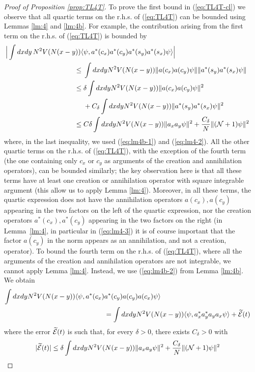 \documentclass[11pt,a4paper,DIV11]{scrartcl}	%
\newcommand{\wt}{\widetilde}
\newcommand{\cE}{{\cal E}}
\newcommand{\cN}{{\cal N}}
\begin{document}
\begin{proof}[Proof of Proposition \ref{prop:TL4T}] 
To prove the first bound in (\ref{eq:TL4T-cl}) we observe that all quartic terms on the r.h.s. of (\ref{eq:TL4T}) can be bounded using Lemmas \ref{lm:4} and \ref{lm:4b}. For example, the contribution arising from the 
first term on the r.h.s. of (\ref{eq:TL4T}) is bounded by
\[ \begin{split} 
\Big| \int dx dy \,  N^2 V (N (x-y)) \langle &\psi ,  a^* (c_x) a^* (c_y) a^* (s_y) a^* (s_x) \psi \rangle \Big| \\\leq \; & \int dx dy N^2 V(N (x-y)) \| a (c_x) a (c_y) \psi \| \| a^* (s_y) a^* (s_x) \psi \| \\
\leq \; & \delta \int dx dy N^2 V (N (x-y)) \| a (c_x) a(c_y) \psi \|^2 \\ &+C_\delta \int dx dy N^2 V(N (x-y)) \| a^* (s_y) a^* (s_x) \psi \|^2 \\
\leq \; & C \delta \int dx dy N^2 V (N (x-y)) \| a_x a_y \psi \|^2 + \frac{C_\delta}{N} \|(\cN+1) \psi \|^2 \end{split} \]
where, in the last inequality, we used (\ref{eq:lm4b-1})  and (\ref{eq:lm4-2}). All the other quartic terms on the r.h.s. of (\ref{eq:TL4T}), with the exception of the fourth term (the one containing only $c_x$ or $c_y$ as arguments of the creation and annihilation operators), can be bounded similarly; the key observation here is that all these terms have at least one creation or annihilation operator with square integrable argument (this allow us to apply Lemma \ref{lm:4}). Moreover, in all these terms, the quartic expression does not have the annihilation operators $a(c_x), a(c_y)$ appearing in the two factors on the left of the quartic expression, nor the creation operators $a^* (c_x), a^*  (c_y)$ appearing in the two factors on the right (in Lemma~\ref{lm:4}, in particular in (\ref{eq:lm4-3}) it is of course important that the factor $a(c_y)$ in the norm appears as an annihilation, and not a creation, operator). To bound the fourth term on the r.h.s. of (\ref{eq:TL4T}), where all the arguments of the creation and annihilation operators are not integrable, we cannot apply Lemma \ref{lm:4}. Instead, we use (\ref{eq:lm4b-2}) from Lemma \ref{lm:4b}. We obtain
\[ \begin{split}  \int dx dy N^2 V(N(x-y)) \langle \psi, a^* (c_x) &a^* (c_y) a(c_y) a(c_x) \psi \rangle \\ &=  \int dx dy N^2 V(N (x-y)) \langle \psi , a_x^* a_y^* a_y a_x \psi \rangle + \wt{\cE} (t) \end{split} \]
where the error $\wt{\cE} (t)$ is such that, for every $\delta > 0$, there exists $C_\delta >0$ with
\[ |\wt{\cE} (t)| \leq  \delta \int dx dy N^2 V(N (x-y)) \| a_x a_y \psi \|^2 + \frac{C_\delta}{N} \| (\cN+1) \psi \|^2 \]


\end{proof}
\end{document}
